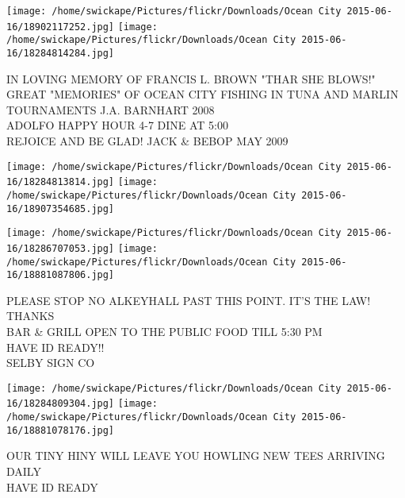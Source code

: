 \documentclass[10pt,letterpaper]{article}
\begin{document}
\texttt{[image: /home/swickape/Pictures/flickr/Downloads/Ocean City 2015-06-16/18902117252.jpg]}
\texttt{[image: /home/swickape/Pictures/flickr/Downloads/Ocean City 2015-06-16/18284814284.jpg]}

IN LOVING MEMORY OF FRANCIS L. BROWN "THAR SHE BLOWS!"\\
GREAT "MEMORIES" OF OCEAN CITY FISHING IN TUNA AND MARLIN TOURNAMENTS J.A. BARNHART 2008\\
ADOLFO HAPPY HOUR 4{-}7 DINE AT 5:00\\
REJOICE AND BE GLAD!  JACK \& BEBOP MAY 2009\\
\pagebreak

\texttt{[image: /home/swickape/Pictures/flickr/Downloads/Ocean City 2015-06-16/18284813814.jpg]}
\texttt{[image: /home/swickape/Pictures/flickr/Downloads/Ocean City 2015-06-16/18907354685.jpg]}

\texttt{[image: /home/swickape/Pictures/flickr/Downloads/Ocean City 2015-06-16/18286707053.jpg]}
\texttt{[image: /home/swickape/Pictures/flickr/Downloads/Ocean City 2015-06-16/18881087806.jpg]}

PLEASE STOP NO ALKEYHALL PAST THIS POINT.  IT'S THE LAW!  THANKS\\
BAR \& GRILL OPEN TO THE PUBLIC FOOD TILL 5:30 PM\\
HAVE ID READY!!\\
SELBY SIGN CO\\
\pagebreak

\texttt{[image: /home/swickape/Pictures/flickr/Downloads/Ocean City 2015-06-16/18284809304.jpg]}
\texttt{[image: /home/swickape/Pictures/flickr/Downloads/Ocean City 2015-06-16/18881078176.jpg]}

OUR TINY HINY WILL LEAVE YOU HOWLING NEW TEES ARRIVING DAILY\\
HAVE ID READY\\
\pagebreak
\end{document}
